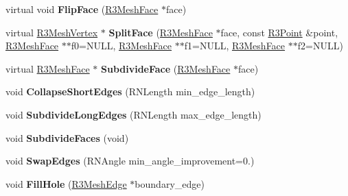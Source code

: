 \begin{DoxyCompactItemize}
\item 
virtual void {\bfseries Flip\+Face} (\hyperlink{class_r3_mesh_face}{R3\+Mesh\+Face} $\ast$face)\hypertarget{class_r3_mesh_a177eab027fe3e6850cfce0c82781e84a}{}\label{class_r3_mesh_a177eab027fe3e6850cfce0c82781e84a}

\item 
virtual \hyperlink{class_r3_mesh_vertex}{R3\+Mesh\+Vertex} $\ast$ {\bfseries Split\+Face} (\hyperlink{class_r3_mesh_face}{R3\+Mesh\+Face} $\ast$face, const \hyperlink{class_r3_point}{R3\+Point} \&point, \hyperlink{class_r3_mesh_face}{R3\+Mesh\+Face} $\ast$$\ast$f0=N\+U\+LL, \hyperlink{class_r3_mesh_face}{R3\+Mesh\+Face} $\ast$$\ast$f1=N\+U\+LL, \hyperlink{class_r3_mesh_face}{R3\+Mesh\+Face} $\ast$$\ast$f2=N\+U\+LL)\hypertarget{class_r3_mesh_ad731987d88f72abab837d9d4c325a926}{}\label{class_r3_mesh_ad731987d88f72abab837d9d4c325a926}

\item 
virtual \hyperlink{class_r3_mesh_face}{R3\+Mesh\+Face} $\ast$ {\bfseries Subdivide\+Face} (\hyperlink{class_r3_mesh_face}{R3\+Mesh\+Face} $\ast$face)\hypertarget{class_r3_mesh_a044d86ccea8fbfa262474f60171f078f}{}\label{class_r3_mesh_a044d86ccea8fbfa262474f60171f078f}

\item 
void {\bfseries Collapse\+Short\+Edges} (R\+N\+Length min\+\_\+edge\+\_\+length)\hypertarget{class_r3_mesh_ab2e4ffc84b3d87d6806534c53121e941}{}\label{class_r3_mesh_ab2e4ffc84b3d87d6806534c53121e941}

\item 
void {\bfseries Subdivide\+Long\+Edges} (R\+N\+Length max\+\_\+edge\+\_\+length)\hypertarget{class_r3_mesh_a31db59370c64b3fe91d52ae7c11fee94}{}\label{class_r3_mesh_a31db59370c64b3fe91d52ae7c11fee94}

\item 
void {\bfseries Subdivide\+Faces} (void)\hypertarget{class_r3_mesh_a80941253fad11bcea789a33274dca0da}{}\label{class_r3_mesh_a80941253fad11bcea789a33274dca0da}

\item 
void {\bfseries Swap\+Edges} (R\+N\+Angle min\+\_\+angle\+\_\+improvement=0.)\hypertarget{class_r3_mesh_afcdbaeaad8f6d1d13c43abcfab0d4b4c}{}\label{class_r3_mesh_afcdbaeaad8f6d1d13c43abcfab0d4b4c}

\item 
void {\bfseries Fill\+Hole} (\hyperlink{class_r3_mesh_edge}{R3\+Mesh\+Edge} $\ast$boundary\+\_\+edge)\hypertarget{class_r3_mesh_a8522c19fe5889027a9684022598d8419}{}\label{class_r3_mesh_a8522c19fe5889027a9684022598d8419}


\end{DoxyCompactItemize}
